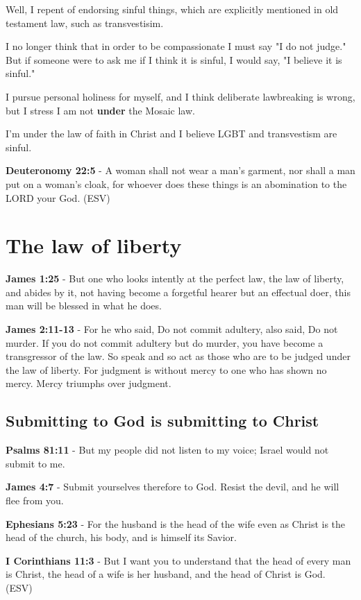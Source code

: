 \documentclass[11pt]{article}
\begin{document}
Well, I repent of endorsing sinful things,
which are explicitly mentioned in old
testament law, such as transvestisim.

I no longer think that in order to be compassionate I must say "I do not judge."
But if someone were to ask me if I think it is sinful, I would say, "I believe it is sinful."

I pursue personal holiness for myself, and I
think deliberate lawbreaking is wrong,
but I stress I am not \textbf{under} the Mosaic law.

I'm under the law of faith in Christ and I believe
LGBT and transvestism are sinful.

\textbf{Deuteronomy 22:5} - A woman shall not wear a man's garment, nor shall a man put on a woman's cloak, for whoever does these things is an abomination to the LORD your God. (ESV)

\section{The law of liberty}
\label{sec:orgf8eeef7}
\textbf{James 1:25} - But one who looks intently at the perfect law, the law of liberty, and abides by it, not having become a forgetful hearer but an effectual doer, this man will be blessed in what he does.

\textbf{James 2:11-13} - For he who said, Do not commit adultery, also said, Do not murder. If you do not commit adultery but do murder, you have become a transgressor of the law.  So speak and so act as those who are to be judged under the law of liberty.  For judgment is without mercy to one who has shown no mercy. Mercy triumphs over judgment.

\subsection{Submitting to God is submitting to Christ}
\label{sec:org667dd1a}
\textbf{Psalms 81:11} - But my people did not listen to my voice; Israel would not submit to me.

\textbf{James 4:7} - Submit yourselves therefore to God. Resist the devil, and he will flee from you.

\textbf{Ephesians 5:23} - For the husband is the head of the wife even as Christ is the head of the church, his body, and is himself its Savior.

\textbf{I Corinthians 11:3} - But I want you to understand that the head of every man is Christ, the head of a wife is her husband, and the head of Christ is God. (ESV)
\end{document}
